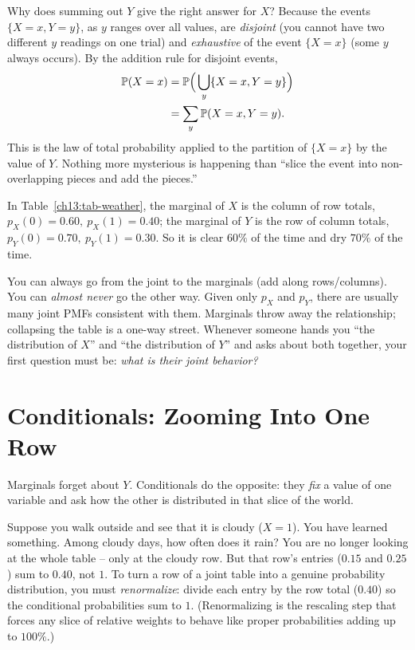 \begin{whybox}
Why does summing out $Y$ give the right answer for $X$? Because the events
$\{X=x, Y=y\}$, as $y$ ranges over all values, are \emph{disjoint} (you cannot
have two different $y$ readings on one trial) and \emph{exhaustive} of the event
$\{X=x\}$ (some $y$ always occurs). By the addition rule for disjoint events,
\begin{align*}
  \P(X=x) &= \P\!\Big(\bigcup_y \{X=x, Y=y\}\Big) \\
          &= \sum_y \P(X=x, Y=y).
\end{align*}
This is the law of total probability applied to the partition of $\{X=x\}$ by the
value of $Y$. Nothing more mysterious is happening than ``slice the event into
non-overlapping pieces and add the pieces.''
\end{whybox}

In Table~\ref{ch13:tab-weather}, the marginal of $X$ is the column of row totals,
$p_X(0)=0.60,\ p_X(1)=0.40$; the marginal of $Y$ is the row of column totals,
$p_Y(0)=0.70,\ p_Y(1)=0.30$. So it is clear $60\%$ of the time and dry $70\%$ of
the time.

\begin{trapbox}
You can always go from the joint to the marginals (add along rows/columns).
You can \emph{almost never} go the other way. Given only $p_X$ and $p_Y$, there
are usually many joint PMFs consistent with them. Marginals throw away the
relationship; collapsing the table is a one-way street. Whenever someone hands
you ``the distribution of $X$'' and ``the distribution of $Y$'' and asks about
both together, your first question must be: \emph{what is their joint behavior?}
\end{trapbox}

\section{Conditionals: Zooming Into One Row}
\label{ch13:conditionals}

Marginals forget about $Y$. Conditionals do the opposite: they \emph{fix} a value
of one variable and ask how the other is distributed in that slice of the world.

\begin{intuitionbox}
Suppose you walk outside and see that it is cloudy ($X=1$). You have learned
something. Among cloudy days, how often does it rain? You are no longer looking
at the whole table -- only at the cloudy row. But that row's entries
($0.15$ and $0.25$) sum to $0.40$, not $1$. To turn a row of a joint table into a
genuine probability distribution, you must \emph{renormalize}: divide each entry
by the row total ($0.40$) so the conditional probabilities sum to $1$.
(Renormalizing is the rescaling step that forces any slice of relative weights
to behave like proper probabilities adding up to $100\%$.)
\end{intuitionbox}

